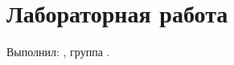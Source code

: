 \documentclass{bbt-test}
\begin{document}
\section*{Лабораторная работа}
Выполнил: \bbtShortName, группа \bbtGroup.

\end{document}
